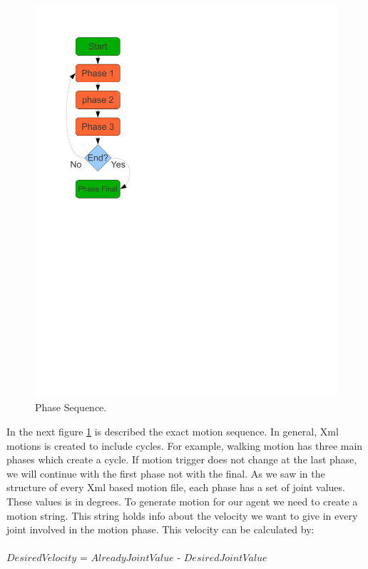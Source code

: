 \begin{figure}[!ht]
\centering
  \includegraphics[trim=0cm 13cm 12cm 0cm, clip=true,scale=0.7]{Chapter3/figures/XMLMotions.pdf}
  \caption{Phase Sequence.}
  \label{fig:PhaseSequence}
\end{figure}
In the next figure \ref{fig:PhaseSequence} is described the exact motion sequence. In general, Xml motions is created to include cycles. For example, walking motion has three main phases which create a cycle. If motion trigger does not change at the last phase, we will continue with the first phase not with the final. As we saw in the structure of every Xml based motion file, each phase has a set of joint values. These values is in degrees. To generate motion for our agent we need to create a motion string. This string holds info about the velocity we want to give in every joint involved in the motion phase. This velocity can be calculated by:
\\
\\
$Desired Velocity$ = $Already Joint Value$ - $Desired Joint Value$\\
